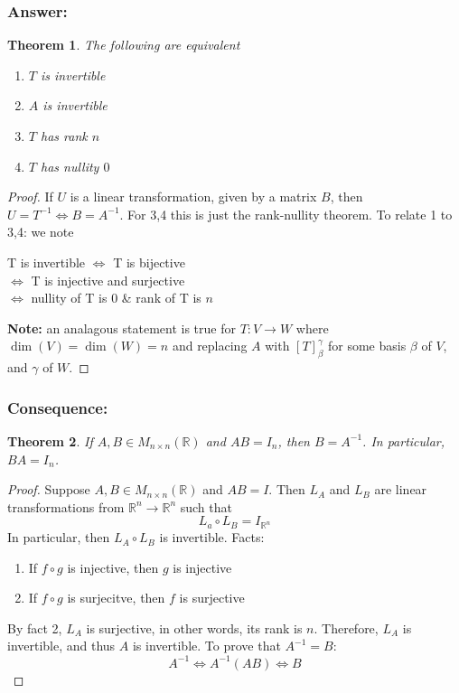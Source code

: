 \documentclass{article}
\newtheorem{theorem}{Theorem}[section]
\newtheorem{one minute paper}[theorem]{One Minute Paper}
\begin{document}
\subsubsection*{Answer:}

\begin{theorem}
    The following are equivalent 
    \begin{enumerate}
        \item $T$ is invertible
        \item $A$ is invertible
        \item $T$ has rank $n$
        \item $T$ has nullity $0$
    \end{enumerate}
\end{theorem}

\begin{proof}
    If $U$ is a linear transformation, given by a matrix $B$, then $U = T^{-1} \iff B = A^{-1}$. For 3,4 this is just the rank-nullity theorem. To relate 1 to 3,4: we note 
    \begin{center}
        T is invertible $\iff$ T is bijective \\
        $\iff$ T is injective and surjective \\
        $\iff$ nullity of T is $0$ \& rank of T is $n$
    \end{center}
    \textbf{Note:} an analagous statement is true for $T: V \rightarrow W$ where $\dim(V) = \dim(W) = n$ and replacing $A$ with $[T]_\beta^\gamma$ for some basis $\beta$ of $V$, and $\gamma$ of $W$. 
\end{proof}

\subsubsection*{Consequence:}

\begin{theorem}
    If $A,B \in M_{n \times n}(\mathbb{R})$ and $AB = I_n$, then $B = A^{-1}$. In particular, $BA = I_n$. 
\end{theorem}

\begin{proof}
    Suppose $A,B \in M_{n\times n}(\mathbb{R})$ and $AB = I$. Then $L_A$ and $L_B$ are linear transformations from $\mathbb{R}^n \rightarrow \mathbb{R}^n$ such that 
    \begin{equation}
        L_a \circ L_B = I_{\mathbb{R}^n}
    \end{equation}
    In particular, then $L_A \circ L_B$ is invertible. Facts:
    \begin{enumerate}
        \item If $f \circ g$ is injective, then $g$ is injective
        \item If $f \circ g$ is surjecitve, then $f$ is surjective
    \end{enumerate}
    By fact 2, $L_A$ is surjective, in other words, its rank is $n$. Therefore, $L_A$ is invertible, and thus $A$ is invertible. 
    To prove that $A^{-1} = B$: 
    \begin{equation}
        A^{-1} \iff A^{-1}(AB) \iff B
    \end{equation}
\end{proof}
\end{document}
